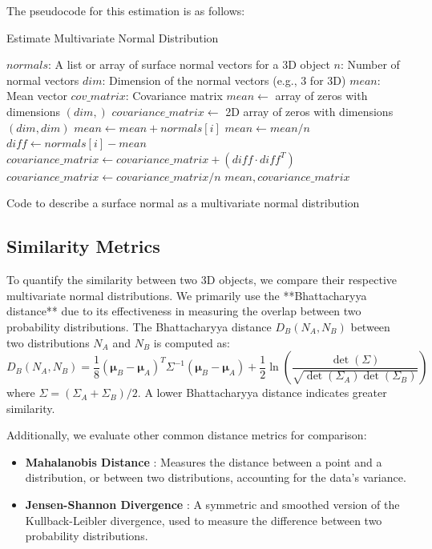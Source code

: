 \documentclass{article}
\begin{document}
The pseudocode for this estimation is as follows:
\begin{algorithm}[H]
\caption{Estimate Multivariate Normal Distribution}
\label{algorithm:estimate-mvn}
\begin{algorithmic}[1]
\Require
  \Statex $normals$: A list or array of surface normal vectors for a 3D object
  \Statex $n$: Number of normal vectors
  \Statex $dim$: Dimension of the normal vectors (e.g., 3 for 3D)
\Ensure
  \Statex $mean$: Mean vector
  \Statex $cov\_matrix$: Covariance matrix
  \State $mean \gets$ array of zeros with dimensions $(dim,)$
  \State $covariance\_matrix \gets$ 2D array of zeros with dimensions $(dim, dim)$
    \State $mean \gets mean + normals[i]$
  \EndFor
  \State $mean \gets mean / n$
    \State $diff \gets normals[i] - mean$
    \State $covariance\_matrix \gets covariance\_matrix + (diff \cdot diff^T)$
  \EndFor
  \State $covariance\_matrix \gets covariance\_matrix / n$
  \State \Return $mean, covariance\_matrix$
\EndFunction
\end{algorithmic}
\caption{Code to describe a surface normal as a multivariate normal distribution}
\end{algorithm}


\subsection{Similarity Metrics}
To quantify the similarity between two 3D objects, we compare their respective multivariate normal distributions. We primarily use the **Bhattacharyya distance** \cite{Bhattacharyya} due to its effectiveness in measuring the overlap between two probability distributions. The Bhattacharyya distance $D_B(N_A, N_B)$ between two distributions $N_A$ and $N_B$ is computed as:
\[
D_B(N_A, N_B) = \frac{1}{8} (\boldsymbol{\mu}_B - \boldsymbol{\mu}_A)^T \Sigma^{-1} (\boldsymbol{\mu}_B - \boldsymbol{\mu}_A) + \frac{1}{2} \ln \left(\frac{\det(\Sigma)}{\sqrt{\det(\Sigma_A) \det(\Sigma_B)}}\right)
\]
where $\Sigma = (\Sigma_A + \Sigma_B) / 2$. A lower Bhattacharyya distance indicates greater similarity.

Additionally, we evaluate other common distance metrics for comparison:
\begin{itemize}
    \item \textbf{Mahalanobis Distance} \cite{Mahalanobis}: Measures the distance between a point and a distribution, or between two distributions, accounting for the data's variance.
    \item \textbf{Jensen-Shannon Divergence} \cite{JensenShannon}: A symmetric and smoothed version of the Kullback-Leibler divergence, used to measure the difference between two probability distributions.
\end{itemize}
\end{document}

